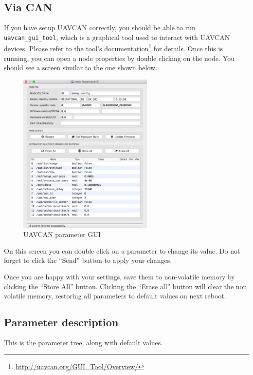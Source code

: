 \subsection{Via CAN}\label{via-can}

If you have setup UAVCAN correctly, you should be able to run
\texttt{uavcan\_gui\_tool}, which is a graphical tool used to interact
with UAVCAN devices. Please refer to
the tool's documentation\footnote{\url{http://uavcan.org/GUI_Tool/Overview/}}
for details. Once this is running, you can open a node properties by
double clicking on the node. You should see a screen similar to the one
shown below.

\begin{figure}
\centering
\includegraphics[width=0.60000\textwidth]{figures/uavcan_gui.png}
\caption{UAVCAN parameter GUI}
\end{figure}

On this screen you can double click on a parameter to change its value.
Do not forget to click the ``Send'' button to apply your changes.

Once you are happy with your settings, save them to non-volatile memory
by clicking the ``Store All'' button. Clicking the ``Erase all'' button
will clear the non volatile memory, restoring all parameters to default
values on next reboot.

\subsection{Parameter description}\label{parameter-description}

This is the parameter tree, along with default values.

